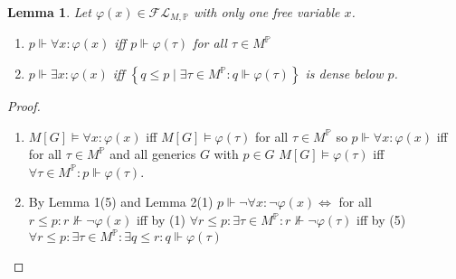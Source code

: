 \documentclass{scrartcl}
\newcommand{\set}[1]{\left\{#1\right\}}
\theoremstyle{definition}
\theoremstyle{plain}
\newtheorem*{lemma*}{Lemma}
\theoremstyle{remark}
\begin{document}
	\begin{lemma*}
		Let $\varphi(x) \in \mathcal{FL}_{M, \mathbb{P}}$ with only one free
		variable $x$.

		 \begin{enumerate}[1.]
		 	\item $p \Vdash \forall x: \varphi(x)$ iff $p \Vdash \varphi(\tau)$ for all
			$\tau \in M^\mathbb{P}$
			\item $p \Vdash \exists x: \varphi(x)$ iff $\set{q \leq p \mid
			\exists \tau \in M^\mathbb{P}: q \Vdash \varphi(\tau)}$ is dense
			below $p$.
		 \end{enumerate}
	\end{lemma*}

	\begin{proof}
		\begin{enumerate}[1.]
			\item $M[G] \vDash \forall x: \varphi(x)$ iff $M[G] \vDash \varphi(\tau)$
			for all $\tau \in M^\mathbb{P}$ so $p \Vdash \forall x: \varphi(x)$ iff
			for all $\tau \in M^\mathbb{P}$ and all generics $G$ with $p \in G$
			$M[G] \vDash \varphi(\tau)$ iff $\forall \tau \in M^\mathbb{P}: p \Vdash
			\varphi(\tau)$.

			\item By Lemma 1(5) and Lemma 2(1) $p\Vdash \lnot \forall x:\lnot \varphi(x)
			\iff $ for all $r \leq p: r \nVdash \lnot \varphi(x) $ iff by (1) $
			\forall r\leq p: \exists \tau \in M^\mathbb{P}: r\nVdash \lnot \varphi(\tau)
			$ iff by (5) $\forall r \leq p: \exists \tau \in M^\mathbb{P}: \exists q \leq r: q \Vdash \varphi(\tau)$
		\end{enumerate}
	\end{proof}
\end{document}
